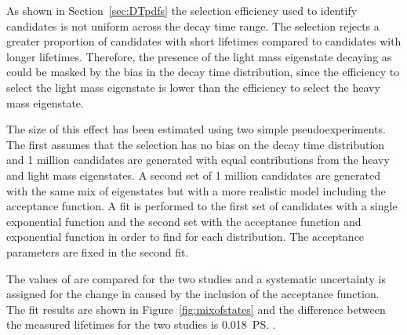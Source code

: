 As shown in Section~\ref{sec:DTpdfs} the selection efficiency used to identify \bsmumu candidates is not uniform across the decay time range. The selection rejects a greater proportion of candidates with short lifetimes compared to candidates with longer lifetimes. Therefore, the presence of the light \bs mass eigenstate decaying as \bsmumu could be masked by the bias in the decay time distribution, since the efficiency to select the light \bs mass eigenstate is lower than the efficiency to select the heavy \bs mass eigenstate.

The size of this effect has been estimated using two simple pseudoexperiments. The first assumes that the selection has no bias on the decay time distribution and 1 million candidates are generated with equal contributions from the heavy and light \bs mass eigenstates. %
 A second set of 1 million candidates are generated with the same mix of eigenstates but with a more realistic model including the \bsmumu acceptance function. A fit is performed to the first set of candidates with a single exponential function and the second set with the acceptance function and exponential function in order to find \tmumu for each distribution. The acceptance parameters are fixed in the second fit.

The values of \tmumu are compared for the two studies and a systematic uncertainty is assigned for the change in \tmumu caused by the inclusion of the acceptance function. The fit results are shown in Figure~\ref{fig:mixofstates} and the difference between the measured lifetimes for the two studies is 0.018~\ps.

